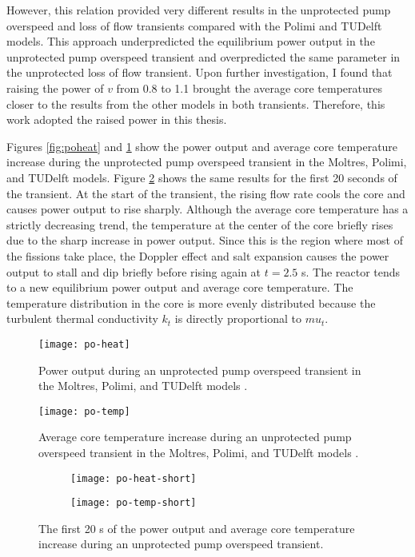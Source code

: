 %
However, this relation provided very different results in the unprotected pump
overspeed and loss of flow transients compared with the Polimi and TUDelft
models. This approach underpredicted the equilibrium power output in the
unprotected pump overspeed transient and overpredicted the same parameter in
the unprotected loss of flow transient. Upon further investigation, I
found that raising the power of $v$ from 0.8 to 1.1 brought the
average core temperatures closer to the results from the other models in both
transients. Therefore, this work adopted the raised power in this thesis.

Figures \ref{fig:poheat} and
\ref{fig:potemp} show the power output and average core temperature increase
during the unprotected pump overspeed transient in the Moltres, Polimi, and
TUDelft models. Figure \ref{fig:poshort} shows the same results for the first
20 seconds of the transient. At the start of the transient, the rising flow
rate cools the core and causes power output to rise sharply. Although the
average core temperature has a strictly decreasing trend, the temperature at
the center of the core briefly rises due to the sharp increase in power
output. Since this is the region where most of the fissions take place, the
Doppler effect and salt expansion causes the power output to stall and dip
briefly before rising again at $t=2.5$ s. The reactor tends to a new
equilibrium power output and average core temperature. The temperature
distribution in the core is more evenly distributed because the turbulent
thermal conductivity $k_t$ is directly proportional to $mu_t$.

\begin{figure}[htbp!]
    \centering
    \texttt{[image: po-heat]}
    \caption{Power output during
    an unprotected pump overspeed transient in the Moltres, Polimi, and
    TUDelft models \cite{fiorina_modelling_2014}.}
    \label{fig:poheat}
    \texttt{[image: po-temp]}
    \caption{Average core temperature increase during
    an unprotected pump overspeed transient in the Moltres, Polimi, and
    TUDelft models \cite{fiorina_modelling_2014}.}
    \label{fig:potemp}
\end{figure}

\begin{figure}[htbp!]
    \centering
    \begin{subfigure}[t]{.485\textwidth}
        \centering
        \texttt{[image: po-heat-short]}
    \end{subfigure}
    \hfill
    \begin{subfigure}[t]{.485\textwidth}
        \centering
        \texttt{[image: po-temp-short]}
    \end{subfigure}
    \caption{The first 20 s of the power output and average core temperature
    increase during an unprotected pump overspeed transient.}
    \label{fig:poshort}
\end{figure}

